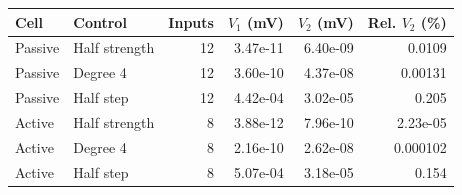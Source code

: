 \begin{tabular}{llrrrr}
\toprule
Cell & Control & Inputs & $V_1$ (mV) & $V_2$ (mV) & Rel. $V_2$ (\%)\\
\midrule
Passive & Half strength & 12 & 3.47e-11 & 6.40e-09 & 0.0109  \\
Passive & Degree 4 & 12 & 3.60e-10 & 4.37e-08 & 0.00131  \\
Passive & Half step & 12 & 4.42e-04 & 3.02e-05 & 0.205  \\
Active & Half strength & 8 & 3.88e-12 & 7.96e-10 & 2.23e-05  \\
Active & Degree 4 & 8 & 2.16e-10 & 2.62e-08 & 0.000102  \\
Active & Half step & 8 & 5.07e-04 & 3.18e-05 & 0.154  \\
\bottomrule
\end{tabular}
